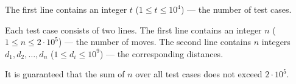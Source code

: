 The first line contains an integer $t$ ($1 \le t \le 10^4$) --- the number of test cases.

Each test case consists of two lines. The first line contains an integer $n$ ($1 \le n \le 2 \cdot 10^5$) --- the number of moves. The second line contains $n$ integers $d_1, d_2, \ldots, d_n$ ($1 \le d_i \le 10^9$) --- the corresponding distances.

It is guaranteed that the sum of $n$ over all test cases does not exceed $2 \cdot 10^5$.
